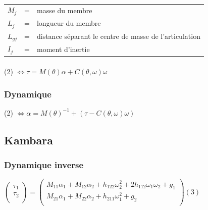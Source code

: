 \documentclass[pdftex,a4paper,11pt]{article}
\begin{document}
\paragraph{}
\begin{tabular}{lcl}
    $M_j$ & = & masse du membre \\
    $L_j$ & = & longueur du membre \\
    $L_{gj}$ & = & distance séparant le centre de masse de l'articulation \\
    $I_{j}$ & = & moment d'inertie \\
\end{tabular}

\paragraph{}
(2) $\Leftrightarrow \tau = M(\theta)\alpha + C(\theta, \omega) \omega  $

\subsubsection{Dynamique}
(2) $\Leftrightarrow \alpha = M(\theta)^{-1} + (\tau - C(\theta, \omega) \omega) $


\subsection{Kambara}

\subsubsection{Dynamique inverse}
$
\begin{pmatrix}
    \tau_1 \\
    \tau_2 \\
\end{pmatrix}
=
\begin{pmatrix}
    M_{11}\alpha_1 + M_{12}\alpha_2 + h_{122}\omega_2^2 + 2h_{112}\omega_1\omega_2 + g_1 \\
    M_{21}\alpha_1 + M_{22}\alpha_2 + h_{211}\omega_1^2 + g_2 \\
\end{pmatrix}
(3)$
\end{document}
